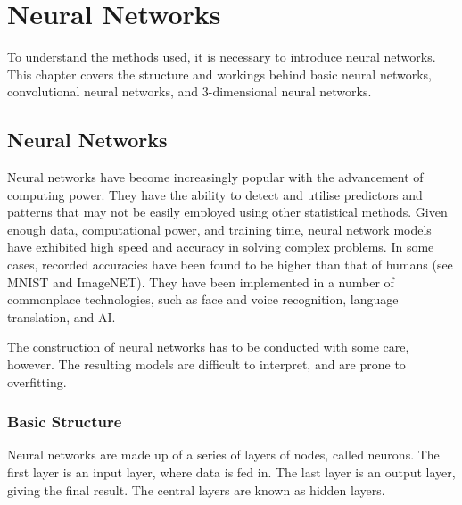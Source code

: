 \documentclass[honours,12pt]{unswthesis}
\numberwithin{equation}{section}
\begin{document}
\chapter{Neural Networks}\label{neuralNets-intro}

To understand the methods used, it is necessary to introduce neural networks. This chapter covers the structure and workings behind basic neural networks, convolutional neural networks, and 3-dimensional neural networks.

% 
% 

{\noindent}\citep{AdamsH.H.Hieab2013RMfD}

\section{Neural Networks}\label{nnets}

Neural networks have become increasingly popular with the advancement of computing power. They have the ability to detect and utilise predictors and patterns that may not be easily employed using other statistical methods. Given enough data, computational power, and training time, neural network models have exhibited high speed and accuracy in solving complex problems. In some cases, recorded accuracies have been found to be higher than that of humans (see MNIST and ImageNET). They have been implemented in a number of commonplace technologies, such as face and voice recognition, language translation, and AI.

The construction of neural networks has to be conducted with some care, however. The resulting models are difficult to interpret, and are prone to overfitting. 

\subsection{Basic Structure}\label{nnets-structure}

Neural networks are made up of a series of layers of nodes, called neurons. The first layer is an input layer, where data is fed in. The last layer is an output layer, giving the final result. The central layers are known as hidden layers.
\end{document}
